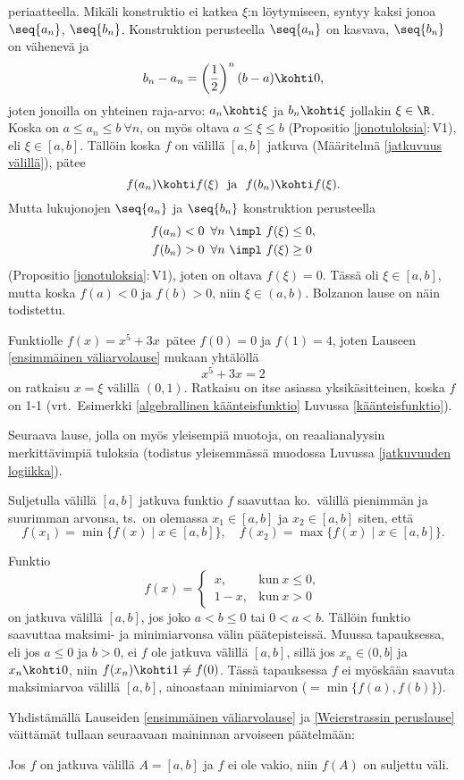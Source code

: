periaatteella. Mikäli konstruktio ei katkea $\xi$:n löytymiseen, syntyy kaksi jonoa
$\seq{a_n}$, $\seq{b_n}$. Konstruktion  perusteella $\seq{a_n}$ on kasvava, $\seq{b_n}$ on
vähenevä ja
\[
b_n-a_n=\left(\frac{1}{2}\right)^n(b-a) \kohti 0,
\]
joten jonoilla on yhteinen raja-arvo: $a_n\kohti\xi$ ja $b_n\kohti\xi$ jollakin $\xi\in\R$.
Koska on $a \le a_n \le b\ \forall n$, on myös oltava $a \le \xi \le b$ 
(Propositio \ref{jonotuloksia}:\,V1), eli $\xi \in [a,b]$. Tällöin koska $f$ on välillä $[a,b]$ 
jatkuva (Määritelmä \ref{jatkuvuus välillä}), pätee
\[
f(a_n) \kohti f(\xi)\ \ \text{ja}\ \ f(b_n) \kohti f(\xi).
\]
Mutta lukujonojen $\seq{a_n}$ ja $\seq{b_n}$ konstruktion perusteella
\begin{align*}
f(a_n)<0\,\ \forall n \ &\impl \ f(\xi)\le 0, \\
f(b_n)>0\,\ \forall n \ &\impl \ f(\xi)\ge 0
\end{align*}
(Propositio \ref{jonotuloksia}:\,V1), joten on oltava $f(\xi)=0$. Tässä oli $\xi\in [a,b]$,
mutta koska $f(a)<0$ ja $f(b)>0$, niin $\xi \in (a,b)$. Bolzanon lause on näin todistettu.
\loppu
\begin{Exa}
Funktiolle $f(x)=x^5+3x\,$ pätee $f(0)=0$ ja $f(1)=4$, joten Lauseen 
\ref{ensimmäinen väliarvolause} mukaan yhtälöllä
\[ 
x^5 + 3x = 2 
\]
on ratkaisu $x=\xi$ välillä $(0,1)$. Ratkaisu on itse asiassa yksikäsitteinen, koska 
$f$ on 1-1 (vrt.\ Esimerkki \ref{algebrallinen käänteisfunktio} Luvussa \ref{käänteisfunktio}).
\loppu \end{Exa}

Seuraava lause, jolla on myös yleisempiä muotoja, on reaalianalyysin merkittävimpiä tuloksia
(todistus yleisemmässä muodossa Luvussa \ref{jatkuvuuden logiikka}).
\begin{*Lause}  \label{Weierstrassin peruslause}
Suljetulla välillä $[a,b]$ jatkuva funktio $f$ saavuttaa ko.\ välillä pienimmän ja suurimman
arvonsa, ts.\ on olemassa $x_1 \in [a,b]$ ja $x_2 \in [a,b]$ siten, että
\[ 
f(x_1) = \min\{f(x) \mid x \in [a,b]\}, \quad f(x_2) = \max\{f(x) \mid x \in [a,b]\}. 
\]
\end{*Lause}
\begin{Exa} Funktio
\[
f(x)=\begin{cases} \,x, &\text{kun}\ x \le 0, \\ \,1-x, &\text{kun}\ x>0 \end{cases}
\]
on jatkuva välillä $[a,b]$, jos joko $a < b \le 0$ tai $0<a<b$. Tällöin funktio saavuttaa
maksimi- ja minimiarvonsa välin päätepisteissä. Muussa tapauksessa, eli jos $a \le 0$ ja
$b>0$, ei $f$ ole jatkuva välillä $[a,b]$, sillä jos $x_n\in(0,b]$ ja $x_n \kohti 0$, niin
$f(x_n) \kohti 1 \neq f(0)$. Tässä tapauksessa $f$ ei myöskään saavuta maksimiarvoa
välillä $[a,b]$, ainoastaan minimiarvon ($=\min\{f(a),f(b)\}$). \loppu
\end{Exa} 
Yhdistämällä Lauseiden \ref{ensimmäinen väliarvolause} ja \ref{Weierstrassin peruslause} 
väittämät tullaan seuraavaan maininnan arvoiseen päätelmään:
\begin{Kor} \label{eräs jatkuvuuskorollaari} Jos $f$ on jatkuva välillä $A=[a,b]$ ja $f$ ei
ole vakio, niin $f(A)$ on suljettu väli. \end{Kor}

